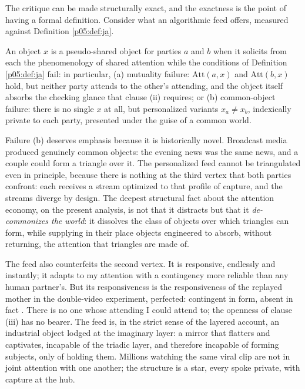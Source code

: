 The critique can be made structurally exact, and the exactness is the point of having a formal definition. Consider what an algorithmic feed offers, measured against Definition \ref{p05:def:ja}.

\begin{defn}\label{p05:def:pseudo}
An object $x$ is a pseudo-shared object for parties $a$ and $b$ when it solicits from each the phenomenology of shared attention while the conditions of Definition \ref{p05:def:ja} fail: in particular, (a) mutuality failure: $\mathrm{Att}(a,x)$ and $\mathrm{Att}(b,x)$ hold, but neither party attends to the other's attending, and the object itself absorbs the checking glance that clause (ii) requires; or (b) common-object failure: there is no single $x$ at all, but personalized variants $x_a \neq x_b$, indexically private to each party, presented under the guise of a common world.
\end{defn}

Failure (b) deserves emphasis because it is historically novel. Broadcast media produced genuinely common objects: the evening news was the same news, and a couple could form a triangle over it. The personalized feed cannot be triangulated even in principle, because there is nothing at the third vertex that both parties confront: each receives a stream optimized to that profile of capture, and the streams diverge by design. The deepest structural fact about the attention economy, on the present analysis, is not that it distracts but that it \emph{de-commonizes the world}: it dissolves the class of objects over which triangles can form, while supplying in their place objects engineered to absorb, without returning, the attention that triangles are made of.

The feed also counterfeits the second vertex. It is responsive, endlessly and instantly; it adapts to my attention with a contingency more reliable than any human partner's. But its responsiveness is the responsiveness of the replayed mother in the double-video experiment, perfected: contingent in form, absent in fact \parencite{murray1985}. There is no one whose attending I could attend to; the openness of clause (iii) has no bearer. The feed is, in the strict sense of the layered account, an industrial object lodged at the imaginary layer: a mirror that flatters and captivates, incapable of the triadic layer, and therefore incapable of forming subjects, only of holding them. Millions watching the same viral clip are not in joint attention with one another; the structure is a star, every spoke private, with capture at the hub.

